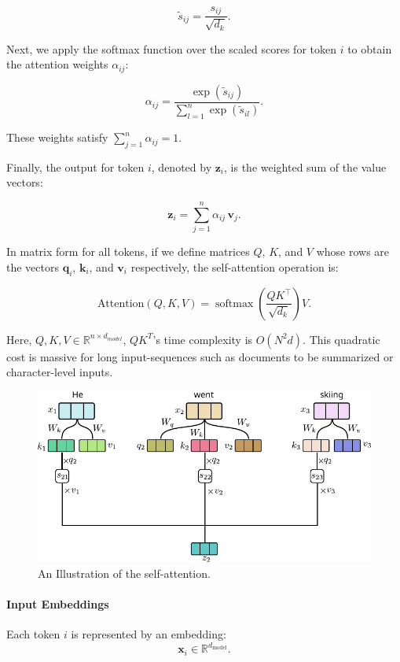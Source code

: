\[
\tilde{s}_{ij} = \frac{s_{ij}}{\sqrt{d_k}}.
\]

Next, we apply the softmax function over the scaled scores for token \( i \) to obtain the attention weights \( \alpha_{ij} \):

\[
\alpha_{ij} = \frac{\exp(\tilde{s}_{ij})}{\displaystyle \sum_{l=1}^{n} \exp(\tilde{s}_{il})}.
\]

These weights satisfy \( \sum_{j=1}^{n} \alpha_{ij} = 1 \).

Finally, the output for token \( i \), denoted by \( \mathbf{z}_i \), is the weighted sum of the value vectors:

\[
\mathbf{z}_i = \sum_{j=1}^{n} \alpha_{ij} \, \mathbf{v}_j.
\]

In matrix form for all tokens, if we define matrices \( Q \), \( K \), and \( V \) whose rows are the vectors \( \mathbf{q}_i \), \( \mathbf{k}_i \), and \( \mathbf{v}_i \) respectively, the self-attention operation is:

\[
\text{Attention}(Q, K, V) = \operatorname{softmax}\!\left(\frac{QK^\top}{\sqrt{d_k}}\right) V.
\]

Here, $Q, K, V\in \mathbb{R}^{n\times d_{model}}$, $QK^T$'s time complexity is $O(N^2d)$. This quadratic cost is massive for long input-sequences such as documents to be summarized or character-level inputs.

\begin{figure}[t]
	\centering
	\includegraphics[scale=1.0]{./images/transformer/attention.pdf}
	\caption{An Illustration of the self-attention.}
\end{figure}

\paragraph{Input Embeddings}

   Each token \( i \) is represented by an embedding:
   \[
   \mathbf{x}_i \in \mathbb{R}^{d_{\text{model}}}.
   \]
   
